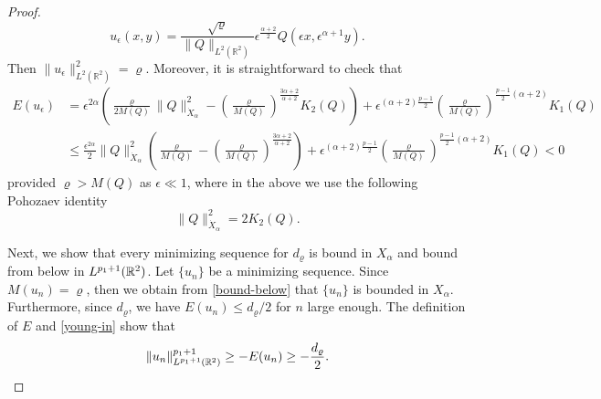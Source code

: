 \documentclass[10pt]{article}
\numberwithin{equation}{section}
\newcommand{\lt}{{L^2(\mathbb{R}^2)}}
\newcommand{\xx}{{\dot{X}_\alpha}}
\newcommand{\al}{\alpha}
\newcommand{\rt}{{\mathbb{R}^2}}
\begin{document}
\begin{proof}
		\[
		u_\epsilon(x,y)=\frac{\sqrt{\varrho}}{\|Q\|_\lt}\epsilon^{\frac{\al+2}{2}}Q(\epsilon x,\epsilon^{\al+1}y).
		\] 
		Then $\|u_\epsilon\|_\lt^2=\varrho$. Moreover, it is straightforward to check that
		\begin{equation}\label{lowerb}
			\begin{split}
				E(u_\epsilon)&=\epsilon^{2\al}\left(
				\frac{\varrho}{2M(Q)}\|Q\|_\xx^2- \left(\frac{\varrho}{M(Q)}\right)^{\frac{3\al+2}{\al+2}}K_2(Q)\right)
				+
				\epsilon^{(\al+2)\frac{p-1}{2}}
				\left(\frac{\varrho}{M(Q)}\right)^{\frac{p-1}{2}(\al+2)}K_1(Q)\\
				&\leq 
				\frac{\epsilon^{2\al}}{2}\|Q\|_\xx^2\left(
				\frac{\varrho}{M(Q)}- \left(\frac{\varrho}{M(Q)}\right)^{\frac{3\al+2}{\al+2}}\right)
				+
				\epsilon^{(\al+2)\frac{p-1}{2}}
				\left(\frac{\varrho}{M(Q)}\right)^{\frac{p-1}{2}(\al+2)}K_1(Q)<0
			\end{split}
		\end{equation}
		provided $\varrho>M(Q)$ as $\epsilon\ll1$,
		where in the above we use the following Pohozaev identity
		\[
		\|Q\|_\xx^2=2K_2(Q).
		\]
		
		Next, we show that every minimizing sequence for $d_\varrho$ is bound in $X_\al$ and bound from below in $L^{\po+1}(\rt)$. Let $\{u_n\}$ be a minimizing sequence. Since $M(u_n)=\varrho$, then we obtain from \eqref{bound-below} that  $\{u_n\}$ is bounded in $X_\al$.   Furthermore, since $d_\varrho$, we have $E(u_n)\leq d_\varrho/2$ for $n$
		large enough. The definition of $E$ and \eqref{young-in} show  that
		\begin{equation}
			\|u_n\|_{L^{\po+1}(\rt)}^{\po+1}\geq-E(u_n)\geq -\frac{ d_\varrho}{2}.
		\end{equation}
		

\end{proof}
\end{document}
